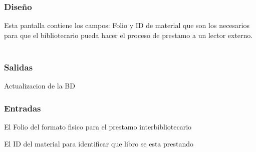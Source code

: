 \subsubsection{Diseño}
	Esta pantalla contiene los campos: Folio y ID de material que son los necesarios para que el bibliotecario pueda hacer el proceso de prestamo a un lector externo.  \\\\


\subsubsection{Salidas}
	\begin{Citemize}
		\item Actualizacion de la BD 
	\end{Citemize}
	
\subsubsection{Entradas}
	\begin{Citemize}
		\item El Folio del formato fisico para el prestamo interbibliotecario
		\item El ID del material para identificar que libro se esta prestando
	\end{Citemize}